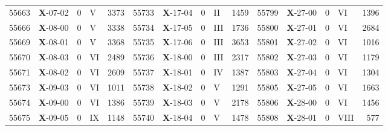 \begin{table*}
\begin{tabular}{llllrllllrllllr}
55663&\textbf{X}-07-02&0&V&3373&55733&\textbf{X}-17-04&0&II&1459&55799&\textbf{X}-27-00&0&VI&1396\\
55666&\textbf{X}-08-00&0&V&3338&55734&\textbf{X}-17-05&0&III&1736&55800&\textbf{X}-27-01&0&VI&2684\\
55669&\textbf{X}-08-01&0&V&3368&55735&\textbf{X}-17-06&0&III&3653&55801&\textbf{X}-27-02&0&VI&1016\\
55670&\textbf{X}-08-03&0&VI&2489&55736&\textbf{X}-18-00&0&III&2317&55802&\textbf{X}-27-03&0&VI&1179\\
55671&\textbf{X}-08-02&0&VI&2609&55737&\textbf{X}-18-01&0&IV&1387&55803&\textbf{X}-27-04&0&VI&1304\\
55673&\textbf{X}-09-03&0&VI&1011&55738&\textbf{X}-18-02&0&V&1291&55805&\textbf{X}-27-05&0&VI&1663\\
55674&\textbf{X}-09-00&0&VI&1386&55739&\textbf{X}-18-03&0&V&2178&55806&\textbf{X}-28-00&0&VI&1456\\
55675&\textbf{X}-09-05&0&IX&1148&55740&\textbf{X}-18-04&0&V&1478&55808&\textbf{X}-28-01&0&VIII&577\\
\hline
\hline
\end{tabular}

\end{table*}

